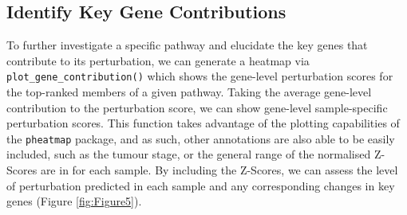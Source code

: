 \documentclass[9pt,a4paper,]{extarticle}
\begin{document}
\hypertarget{identify-key-gene-contributions}{%
\subsection{Identify Key Gene Contributions}\label{identify-key-gene-contributions}}

To further investigate a specific pathway and elucidate the key genes that contribute to its perturbation, we can generate a heatmap via \texttt{plot\_gene\_contribution()} which shows the gene-level perturbation scores for the top-ranked members of a given pathway.
Taking the average gene-level contribution to the perturbation score, we can show gene-level sample-specific perturbation scores.
This function takes advantage of the plotting capabilities of the \texttt{pheatmap} package, and as such, other annotations are also able to be easily included, such as the tumour stage, or the general range of the normalised Z-Scores are in for each sample.
By including the Z-Scores, we can assess the level of perturbation predicted in each sample and any corresponding changes in key genes (Figure \ref{fig:Figure5}).
\end{document}
